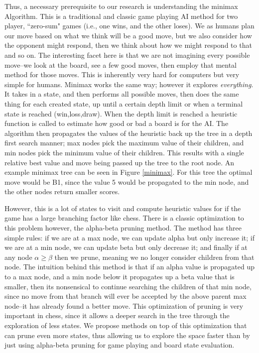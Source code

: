\documentclass[letterpaper]{article}
\begin{document}
Thus, a necessary prerequisite to our research is understanding the minimax Algorithm. This is a traditional and classic game playing AI method for two player, ``zero-sum" games (i.e., one wins, and the other loses). We as humans plan our move based on what we think will be a good move, but we also consider how the opponent might respond, then we think about how we might respond to that and so on. The interesting facet here is that we are not imagining every possible move--we look at the board, see a few good moves, then employ that mental method for those moves. This is inherently very hard for computers but very simple for humans.  Minimax works the same way; however it explores \textit{everything}. It takes in a state, and then performs all possible moves, then does the same thing for each created state, up until a certain depth limit or when a terminal state is reached (win,loss,draw). When the depth limit is reached a heuristic function is called to estimate how good or bad a board is for the AI.  The algorithm then propagates the values of the heuristic back up the tree in a depth first search manner; max nodes pick the maximum value of their children, and min nodes pick the minimum value of their children. This results with a single relative best value and move being passed up the tree to the root node. An example minimax tree can be seen in Figure \ref{minimax}. For this tree the optimal move would be B1, since the value 5 would be propagated to the min node, and the other nodes return smaller scores.

However, this is a lot of states to visit and compute heuristic values for if the game has a large branching factor like chess. There is a classic optimization to this problem however, the alpha-beta pruning method. The method has three simple rules: if we are at a max node, we can update alpha but only increase it; if we are at a min node, we can update beta but only decrease it; and finally if at any node $\alpha \geq \beta$ then we prune, meaning we no longer consider children from that node. The intuition behind this method is that if an alpha value is propagated up to a max node, and a min node below it propagates up a beta value that is smaller, then its nonsensical to continue searching the children of that min node, since no move from that branch will ever be accepted by the above parent max node--it has already found a better move. This optimization of pruning is very important in chess, since it allows a deeper search in the tree through the exploration of less states. We propose methods on top of this optimization that can prune even more states, thus allowing us to explore the space faster than by just using alpha-beta pruning for game playing and board state evaluation. 
\end{document}
